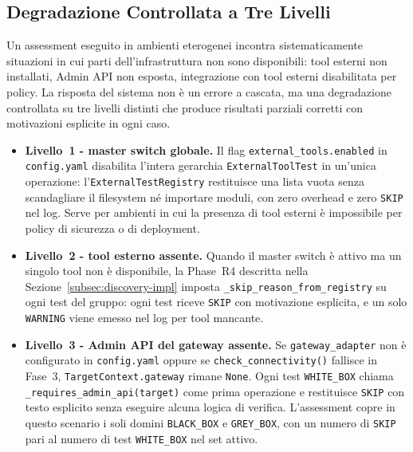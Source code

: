 \subsection{Degradazione Controllata a Tre Livelli}\label{subsec:graceful-degradation}

Un assessment eseguito in ambienti eterogenei incontra sistematicamente situazioni in cui parti dell'infrastruttura non sono disponibili: tool esterni non installati, Admin \gls{API} non esposta, integrazione con tool esterni disabilitata per policy. La risposta del sistema non è un errore a cascata, ma una degradazione controllata su tre livelli distinti che produce risultati parziali corretti con motivazioni esplicite in ogni caso.

\begin{itemize}
      \item \textbf{Livello~1 - master switch globale.} Il flag \texttt{external\_tools.enabled} in \texttt{config.yaml} disabilita l'intera gerarchia \texttt{ExternalToolTest} in un'unica operazione: l'\texttt{ExternalTestRegistry} restituisce una lista vuota senza scandagliare il filesystem né importare moduli, con zero overhead e zero \texttt{SKIP} nel log. Serve per ambienti in cui la presenza di tool esterni è impossibile per policy di sicurezza o di deployment.

      \item \textbf{Livello~2 - tool esterno assente.} Quando il master switch è attivo ma un singolo tool non è disponibile, la Phase~R4 descritta nella Sezione~\ref{subsec:discovery-impl} imposta \texttt{\_skip\_reason\_from\_registry} su ogni test del gruppo: ogni test riceve \texttt{SKIP} con motivazione esplicita, e un solo \texttt{WARNING} viene emesso nel log per tool mancante.

      \item \textbf{Livello~3 - Admin \gls{API} del gateway assente.} Se \texttt{gateway\_adapter} non è configurato in \texttt{config.yaml} oppure se \texttt{check\_connectivity()} fallisce in Fase~3, \texttt{TargetContext.gateway} rimane \texttt{None}. Ogni test \texttt{WHITE\_BOX} chiama \texttt{\_requires\_admin\_api(target)} come prima operazione e restituisce \texttt{SKIP} con testo esplicito senza eseguire alcuna logica di verifica. L'assessment copre in questo scenario i soli domini \texttt{BLACK\_BOX} e \texttt{GREY\_BOX}, con un numero di \texttt{SKIP} pari al numero di test \texttt{WHITE\_BOX} nel set attivo.
\end{itemize}

